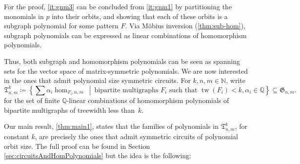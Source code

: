 \documentclass[11pt, DIV=15]{scrarticle}
\theoremstyle{definition}
\theoremstyle{plain}
\theoremstyle{remark}
\DeclareMathOperator{\tw}{tw}
\begin{document}
For the proof,  \cref{it:gnm3} can be concluded from \cref{it:gnm1} by partitioning the monomials in $p$ into their orbits, and showing that each of these orbits is a subgraph polynomial for some pattern $F$. Via Möbius inversion (\cref{thm:sub-hom}), subgraph polynomials can be expressed as linear combinations of homomorphism polynomials.

Thus, both subgraph and homomorphism polynomials can be seen as spanning sets for the vector space of matrix-symmetric polynomials. 
We are now interested in the ones that admit polynomial size symmetric circuits.
For $k,n,m \in \mathbb{N}$, write
\[
\mathfrak{T}_{n,m}^k \coloneqq \left\{\sum \alpha_i \hom_{F_i, n,m} \ \middle|\  \text{bipartite multigraphs } F_i \text{ such that } \tw(F_i) < k, \alpha_i \in \mathbb{Q} \right\} \subseteq \mathfrak{G}_{n,m}.
\]
for the set of finite $\mathbb{Q}$-linear combinations of homomorphism polynomials of bipartite multigraphs of treewidth less than~$k$.

Our main result, \cref{thm:main1}, states that the families of polynomials in $\mathfrak{T}_{n,m}^k$, for constant $k$, are precisely the ones that admit symmetric circuits of polynomial orbit size. The full proof can be found in Section \ref{sec:circuitsAndHomPolynomials} but the idea is the following: 
\end{document}

